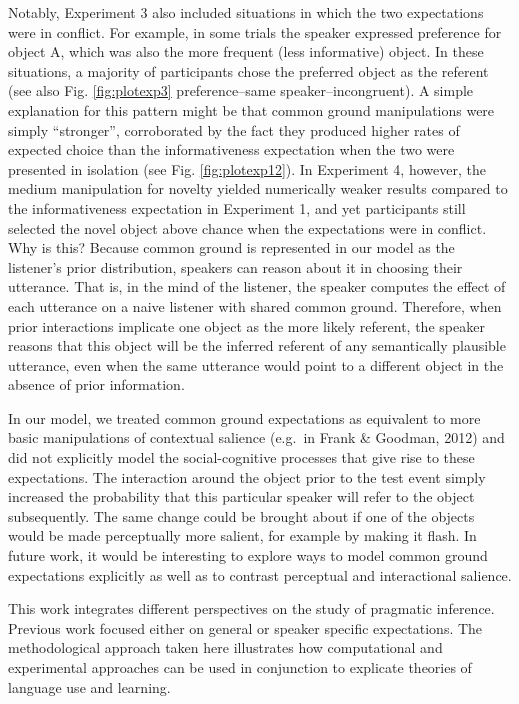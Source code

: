 \documentclass[10pt, letterpaper]{article}
\begin{document}
Notably, Experiment 3 also included situations in which the two
expectations were in conflict. For example, in some trials the speaker
expressed preference for object A, which was also the more frequent
(less informative) object. In these situations, a majority of
participants chose the preferred object as the referent (see also Fig.
\ref{fig:plotexp3} preference--same speaker--incongruent). A simple
explanation for this pattern might be that common ground manipulations
were simply ``stronger'', corroborated by the fact they produced higher
rates of expected choice than the informativeness expectation when the
two were presented in isolation (see Fig. \ref{fig:plotexp12}). In
Experiment 4, however, the medium manipulation for novelty yielded
numerically weaker results compared to the informativeness expectation
in Experiment 1, and yet participants still selected the novel object
above chance when the expectations were in conflict. Why is this?
Because common ground is represented in our model as the listener's
prior distribution, speakers can reason about it in choosing their
utterance. That is, in the mind of the listener, the speaker computes
the effect of each utterance on a naive listener with shared common
ground. Therefore, when prior interactions implicate one object as the
more likely referent, the speaker reasons that this object will be the
inferred referent of any semantically plausible utterance, even when the
same utterance would point to a different object in the absence of prior
information.

In our model, we treated common ground expectations as equivalent to
more basic manipulations of contextual salience (e.g.~in Frank \&
Goodman, 2012) and did not explicitly model the social-cognitive
processes that give rise to these expectations. The interaction around
the object prior to the test event simply increased the probability that
this particular speaker will refer to the object subsequently. The same
change could be brought about if one of the objects would be made
perceptually more salient, for example by making it flash. In future
work, it would be interesting to explore ways to model common ground
expectations explicitly as well as to contrast perceptual and
interactional salience.

This work integrates different perspectives on the study of pragmatic
inference. Previous work focused either on general or speaker specific
expectations. The methodological approach taken here illustrates how
computational and experimental approaches can be used in conjunction to
explicate theories of language use and learning.
\end{document}
